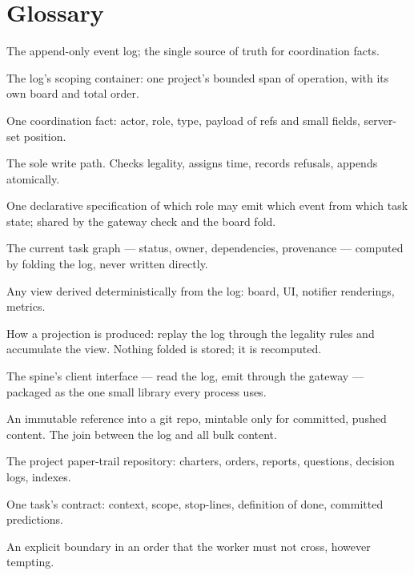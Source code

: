 \appendix

\section{Glossary}

\small
\begin{description}[style=nextline,itemsep=1pt]
\item[spine] The append-only event log; the single source of truth for coordination facts.
\item[run] The log's scoping container: one project's bounded span of operation, with its own board and total order.
\item[event] One coordination fact: actor, role, type, payload of refs and small fields, server-set position.
\item[gateway] The sole write path. Checks legality, assigns time, records refusals, appends atomically.
\item[legality table] One declarative specification of which role may emit which event from which task state; shared by the gateway check and the board fold.
\item[board] The current task graph --- status, owner, dependencies, provenance --- computed by folding the log, never written directly.
\item[projection] Any view derived deterministically from the log: board, UI, notifier renderings, metrics.
\item[fold] How a projection is produced: replay the log through the legality rules and accumulate the view. Nothing folded is stored; it is recomputed.
\item[port] The spine's client interface --- read the log, emit through the gateway --- packaged as the one small library every process uses.
\item[pin / \code{path@sha}] An immutable reference into a git repo, mintable only for committed, pushed content. The join between the log and all bulk content.
\item[workspace] The project paper-trail repository: charters, orders, reports, questions, decision logs, indexes.
\item[order] One task's contract: context, scope, stop-lines, definition of done, committed predictions.
\item[stop-line] An explicit boundary in an order that the worker must not cross, however tempting.

\end{description}
